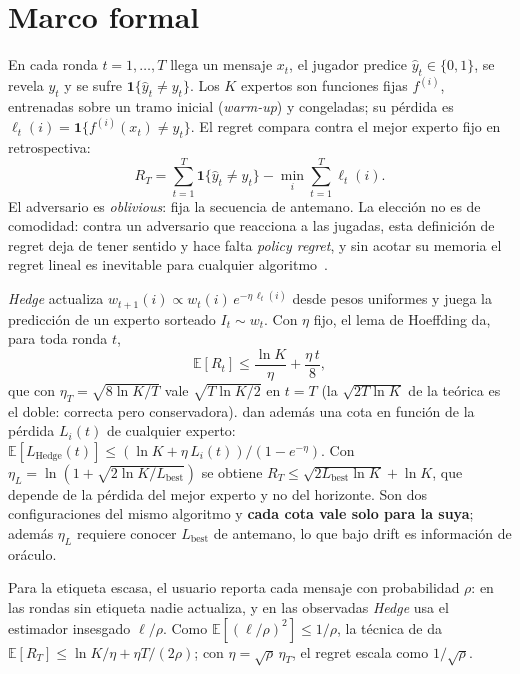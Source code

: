 \documentclass[10pt,twocolumn,a4paper]{article}
\newcommand{\indicadora}{\mathbf{1}}
\newcommand{\etaT}{\eta_T}
\newcommand{\etaL}{\eta_L}
\begin{document}
\section{Marco formal}\label{sec:marco}

En cada ronda $t = 1, \dots, T$ llega un mensaje $x_t$, el jugador predice $\hat y_t \in \{0,1\}$,
se revela $y_t$ y se sufre $\indicadora\{\hat y_t \neq y_t\}$. Los $K$ expertos son funciones fijas
$f^{(i)}$, entrenadas sobre un tramo inicial (\emph{warm-up}) y congeladas; su pérdida es
$\ell_t(i) = \indicadora\{f^{(i)}(x_t) \neq y_t\}$. El regret compara contra el mejor experto fijo en
retrospectiva:
\begin{equation}
R_T = \sum_{t=1}^{T} \indicadora\{\hat y_t \neq y_t\} - \min_i \sum_{t=1}^{T} \ell_t(i).
\end{equation}
El adversario es \emph{oblivious}: fija la secuencia de antemano. La elección no es de comodidad:
contra un adversario que reacciona a las jugadas, esta definición de regret deja de tener sentido y
hace falta \emph{policy regret}, y sin acotar su memoria el regret lineal es inevitable para
cualquier algoritmo~\cite{cesabianchi2013switching,arora2012online}.

\emph{Hedge} actualiza $w_{t+1}(i) \propto w_t(i)\, e^{-\eta\, \ell_t(i)}$ desde pesos uniformes y
juega la predicción de un experto sorteado $I_t \sim w_t$. Con $\eta$ fijo, el lema de Hoeffding da,
para toda ronda $t$,
\begin{equation}\label{eq:peorcaso}
\mathbb{E}[R_t] \le \frac{\ln K}{\eta} + \frac{\eta\, t}{8},
\end{equation}
que con $\etaT = \sqrt{8 \ln K / T}$ vale $\sqrt{T \ln K / 2}$ en $t = T$ (la $\sqrt{2T\ln K}$ de
la teórica es el doble: correcta pero conservadora). \citet{freund1997decision} dan además una cota
en función de la pérdida $L_i(t)$ de cualquier experto:
$\mathbb{E}[L_{\text{Hedge}}(t)] \le (\ln K + \eta\, L_i(t))/(1 - e^{-\eta})$. Con
$\etaL = \ln(1 + \sqrt{2\ln K / L_{\text{best}}})$ se obtiene
$R_T \le \sqrt{2 L_{\text{best}} \ln K} + \ln K$, que depende de la pérdida del mejor experto y no
del horizonte. Son dos configuraciones del mismo algoritmo y \textbf{cada cota vale solo para la
suya}; además $\etaL$ requiere conocer $L_{\text{best}}$ de antemano, lo que bajo drift es
información de oráculo.

Para la etiqueta escasa, el usuario reporta cada mensaje con probabilidad $\rho$: en las rondas sin
etiqueta nadie actualiza, y en las observadas \emph{Hedge} usa el estimador insesgado $\ell/\rho$.
Como $\mathbb{E}[(\ell/\rho)^2] \le 1/\rho$, la técnica de \citet{auer2002nonstochastic} da
$\mathbb{E}[R_T] \le \ln K/\eta + \eta T/(2\rho)$; con $\eta = \sqrt{\rho}\,\etaT$, el regret escala
como $1/\sqrt{\rho}$.
\end{document}
